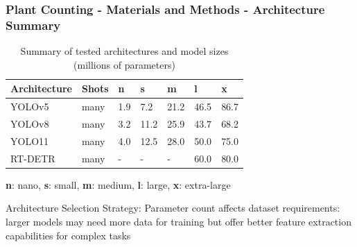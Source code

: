 \documentclass[aspectratio=43]{beamer}
\begin{document}
\begin{frame}
    \frametitle{Plant Counting - Materials and Methods - Architecture Summary}
    
    \begin{table}[H]
        \scriptsize
        \caption{Summary of tested architectures and model sizes (millions of parameters)}
        \begin{tabularx}{\textwidth}{lXXXXXX}
        \toprule
        \textbf{Architecture} &\textbf{Shots} & \textbf{n} & \textbf{s} & \textbf{m} & \textbf{l} & \textbf{x} \\
        \midrule
        YOLOv5 & many & 1.9 & 7.2 & 21.2 & 46.5 & 86.7 \\
        YOLOv8 & many & 3.2 & 11.2 & 25.9 & 43.7 & 68.2 \\
        YOLO11 & many & 4.0 & 12.5 & 28.0 & 50.0 & 75.0 \\
        RT-DETR & many & - & - & - & 60.0 & 80.0 \\
        \bottomrule
        \end{tabularx}
    \end{table}
    
        \scriptsize
        \textbf{n}: nano, \textbf{s}: small, \textbf{m}: medium, \textbf{l}: large, \textbf{x}: extra-large

    
    \begin{alertblock}{Architecture Selection Strategy:}
        \small
        Parameter count affects dataset requirements: larger models may need more data for training but offer better feature extraction capabilities for complex tasks
    \end{alertblock}
\end{frame}
\end{document}
